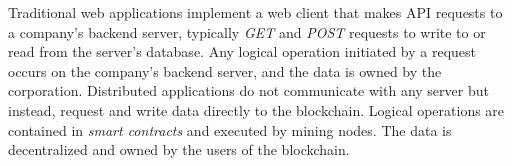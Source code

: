 Traditional web applications implement a web client that makes API requests to a company's backend server,
typically \emph{GET} and \emph{POST} requests to write to or read from the server's database.
Any logical operation initiated by a request occurs on the company's backend server, and the data is owned by the corporation.
Distributed applications do not communicate with any server but instead, request and write data directly to the blockchain.
Logical operations are contained in \emph{smart contracts} and executed by mining nodes.
The data is decentralized and owned by the users of the blockchain.
